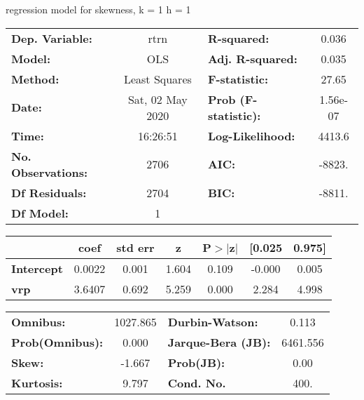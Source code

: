 regression model for skewness, k = 1 h = 1\begin{center}
\begin{tabular}{lclc}
\toprule
\textbf{Dep. Variable:}    &       rtrn       & \textbf{  R-squared:         } &     0.036   \\
\textbf{Model:}            &       OLS        & \textbf{  Adj. R-squared:    } &     0.035   \\
\textbf{Method:}           &  Least Squares   & \textbf{  F-statistic:       } &     27.65   \\
\textbf{Date:}             & Sat, 02 May 2020 & \textbf{  Prob (F-statistic):} &  1.56e-07   \\
\textbf{Time:}             &     16:26:51     & \textbf{  Log-Likelihood:    } &    4413.6   \\
\textbf{No. Observations:} &        2706      & \textbf{  AIC:               } &    -8823.   \\
\textbf{Df Residuals:}     &        2704      & \textbf{  BIC:               } &    -8811.   \\
\textbf{Df Model:}         &           1      & \textbf{                     } &             \\
\bottomrule
\end{tabular}
\begin{tabular}{lcccccc}
                   & \textbf{coef} & \textbf{std err} & \textbf{z} & \textbf{P$> |$z$|$} & \textbf{[0.025} & \textbf{0.975]}  \\
\midrule
\textbf{Intercept} &       0.0022  &        0.001     &     1.604  &         0.109        &       -0.000    &        0.005     \\
\textbf{vrp}       &       3.6407  &        0.692     &     5.259  &         0.000        &        2.284    &        4.998     \\
\bottomrule
\end{tabular}
\begin{tabular}{lclc}
\textbf{Omnibus:}       & 1027.865 & \textbf{  Durbin-Watson:     } &    0.113  \\
\textbf{Prob(Omnibus):} &   0.000  & \textbf{  Jarque-Bera (JB):  } & 6461.556  \\
\textbf{Skew:}          &  -1.667  & \textbf{  Prob(JB):          } &     0.00  \\
\textbf{Kurtosis:}      &   9.797  & \textbf{  Cond. No.          } &     400.  \\
\bottomrule
\end{tabular}
\end{center}

